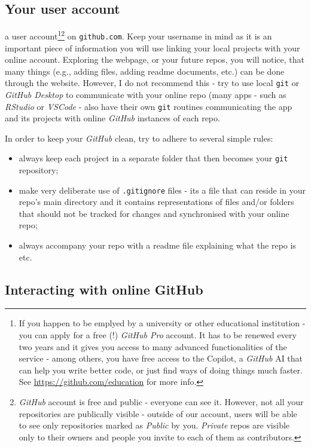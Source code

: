 \documentclass{tufte-handout}
\begin{document}
\subsection{Your user account}

 a user account\footnote{If you happen to be emplyed by a university or other educational institution - you can apply for a free (!) \textit{GitHub Pro} account. It has to be renewed every two years and it gives you access to many advanced functionalities of the service - among others, you have free access to the Copilot, a \textit{GitHub} AI that can help you write better code, or just find ways of doing things much faster. See  \url{https://github.com/education} for more info.}\footnote{\textit{GitHub} account is free and public - everyone can see it. However, not all your repositories are publically visible - outside of our account, users will be able to see only repositories marked as \textit{Public} by you. \textit{Private} repos are visible only to their owners and people you invite to each of them as contributors.} on \texttt{github.com}. Keep your username in mind as it is an important piece of information you will use linking your local projects with your online account. Exploring the webpage, or your future repos, you will notice, that many things (e.g., adding files, adding readme documents, etc.) can be done through the website. However, I do not recommend this - try to use local \texttt{git} or \textit{GitHub Desktop} to communicate with your online repo (many apps - such as \textit{RStudio} or \textit{VSCode} - also have their own \texttt{git} routines communicating the app and its projects with online \textit{GitHub} instances of each repo.

In order to keep your \textit{GitHub} clean, try to adhere to several simple rules:
\begin{itemize}
    \item always keep each project in a separate folder that then becomes your \texttt{git} repository;
    \item make very deliberate use of \texttt{.gitignore} files - its a file that can reside in your repo's main directory and it contains representations of files and/or folders that should not be tracked for changes and synchronised with your online repo;
    \item always accompany your repo with a readme file explaining what the repo is etc.
\end{itemize}

\subsection{Interacting with online GitHub}
\end{document}
